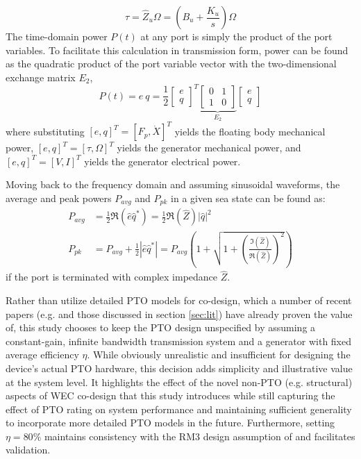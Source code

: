 \begin{equation}
\tau = \hat{Z}_u \Omega =\left(B_u + \frac{K_u}{s} \right) \Omega
\end{equation}
The time-domain power $P(t)$ at any port is simply the product of the port variables.
To facilitate this calculation in transmission form, power can be found as the quadratic product of the port variable vector with the two-dimensional exchange matrix $E_2$,
\begin{equation}
P(t) = e~q
= \frac{1}{2}
\begin{bmatrix}
 e \\ q
\end{bmatrix}^T
\underbrace{\begin{bmatrix}
0 & 1 \\
1 & 0
\end{bmatrix}}
_{E_2}
\begin{bmatrix}
 e \\ q
\end{bmatrix}
\end{equation}
where substituting $[e,q]^T=[F_p,\dot{X}]^T$ yields the floating body mechanical power, $[e,q]^T=[\tau,\Omega]^T$ yields the generator mechanical power, and $[e,q]^T=[V,I]^T$ yields the generator electrical power. 

Moving back to the frequency domain and assuming sinusoidal waveforms, the average and peak powers $P_{avg}$ and $P_{pk}$ in a given sea state can be found as:
\begin{equation}
\begin{aligned}
     P_{avg} &= \frac{1}{2}\Re(\hat{e} \hat{q}^*) = \frac{1}{2} \Re(\hat{Z})|\hat{q}|^2 
    \\
    P_{pk} &=  P_{avg} + \frac{1}{2}|\hat{e} \hat{q}^*| = P_{avg}\left( 1 + \sqrt{1 + \left(\frac{\Im(\hat{Z})}{\Re(\hat{Z})}\right) ^2  } \right)
\end{aligned}
\end{equation}
if the port is terminated with complex impedance $\hat{Z}$. 

Rather than utilize detailed PTO models for co-design, which a number of recent papers (e.g. \cite{coe_useful_2023,gaebele_incorporating_2023} and those discussed in section \ref{sec:lit}) have already proven the value of, this study chooses to keep the PTO design unspecified by assuming a constant-gain, infinite bandwidth transmission system and a generator with fixed average efficiency $\eta$.
While obviously unrealistic and insufficient for designing the device's actual PTO hardware, this decision adds simplicity and illustrative value at the system level.
It highlights the effect of the novel non-PTO (e.g. structural) aspects of WEC co-design that this study introduces while still capturing the effect of PTO rating on system performance and maintaining sufficient generality to incorporate more detailed PTO models in the future.
Furthermore, setting $\eta=80\%$ maintains consistency with the RM3 design assumption of \cite{RM3} and facilitates validation. 

